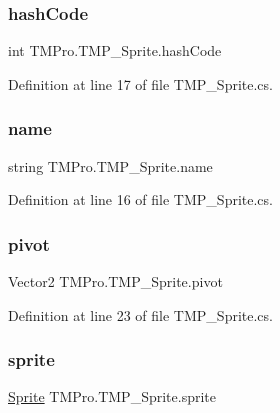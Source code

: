 \subsubsection{\texorpdfstring{hashCode}{hashCode}}
{\footnotesize\ttfamily int T\+M\+Pro.\+T\+M\+P\+\_\+\+Sprite.\+hash\+Code}



Definition at line 17 of file T\+M\+P\+\_\+\+Sprite.\+cs.

\mbox{\label{class_t_m_pro_1_1_t_m_p___sprite_ae78cacfca5d783a5515ce93bc9a6582f}} 
\subsubsection{\texorpdfstring{name}{name}}
{\footnotesize\ttfamily string T\+M\+Pro.\+T\+M\+P\+\_\+\+Sprite.\+name}



Definition at line 16 of file T\+M\+P\+\_\+\+Sprite.\+cs.

\mbox{\label{class_t_m_pro_1_1_t_m_p___sprite_a809fb162ee886b2ea9025590e3aa09ec}} 
\subsubsection{\texorpdfstring{pivot}{pivot}}
{\footnotesize\ttfamily Vector2 T\+M\+Pro.\+T\+M\+P\+\_\+\+Sprite.\+pivot}



Definition at line 23 of file T\+M\+P\+\_\+\+Sprite.\+cs.

\mbox{\label{class_t_m_pro_1_1_t_m_p___sprite_ac12a75abda3c4e38c4df03a3a7269168}} 
\subsubsection{\texorpdfstring{sprite}{sprite}}
{\footnotesize\ttfamily \mbox{\hyperlink{namespace_t_m_pro_ab5662f47179bf1b81c575ecf80b24065a51f2b7b14433aa22c67d1f4fc18943cd}{Sprite}} T\+M\+Pro.\+T\+M\+P\+\_\+\+Sprite.\+sprite}



